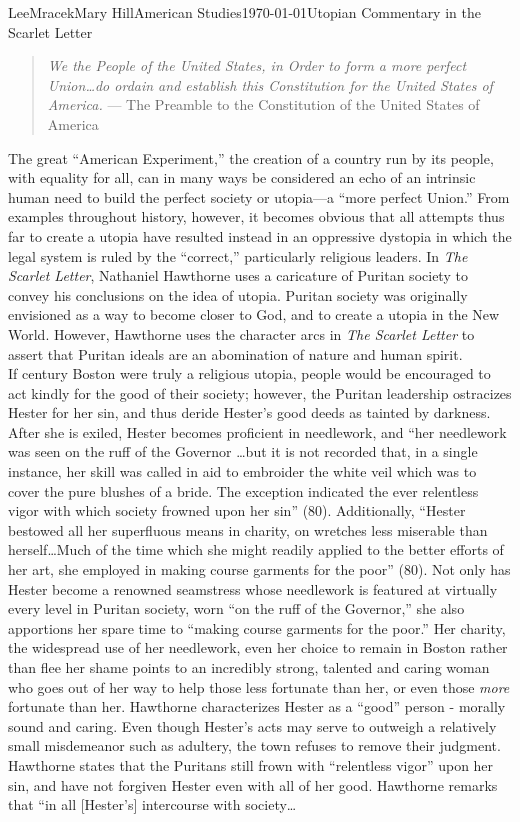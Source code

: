 \documentclass[12pt, letterpaper]{article}
\begin{document}
\begin{mla}{Lee}{Mracek}{Mary Hill}{American Studies}{\today}{Utopian Commentary in the Scarlet Letter}
\begin{quotation}
\textit{We the People of the United States, in Order to form a more perfect Union\ldots do ordain and establish this Constitution for the United States of America.} --- The Preamble to the Constitution of the United States of America
\end{quotation}
        \par The great ``American Experiment,'' the creation of a country run by its people, with equality for all, can in many ways be considered an echo of an intrinsic human need to build the perfect society or utopia---a ``more perfect Union.'' From examples throughout history, however, it becomes obvious that all attempts thus far to create a utopia have resulted instead in an oppressive dystopia in which the legal system is ruled by the ``correct,'' particularly religious leaders. In \textit{The Scarlet Letter}, Nathaniel Hawthorne uses a caricature of Puritan society to convey his conclusions on the idea of utopia. Puritan society was originally envisioned as a way to become closer to God, and to create a utopia in the New World. However, Hawthorne uses the character arcs in \textit{The Scarlet Letter} to assert that Puritan ideals are an abomination of nature and human spirit. \\
        If  century Boston were truly a religious utopia, people would be encouraged to act kindly for the good of their society; however, the Puritan leadership ostracizes Hester for her sin, and thus deride Hester's good deeds as tainted by darkness. After she is exiled, Hester becomes proficient in needlework, and ``her needlework was seen on the ruff of the Governor \ldots but it is not recorded that, in a single instance, her skill was called in aid to embroider the white veil which was to cover the pure blushes of a bride. The exception indicated the ever relentless vigor with which society frowned upon her sin'' (80). Additionally, ``Hester bestowed all her superfluous means in charity, on wretches less miserable than herself\ldots Much of the time which she might readily applied to the 
        better efforts of her art, she employed in making course garments for the poor'' (80). Not only has Hester become a renowned seamstress whose needlework is featured at virtually every level in Puritan society, worn ``on the ruff of the Governor,'' she also apportions her spare time to ``making course garments for the poor.'' Her charity, the widespread use of her needlework, even her choice to remain in Boston rather than flee her shame points to an incredibly strong, talented and caring woman who goes out of her way to help those less fortunate than her, or even those \textit{more} fortunate than her. Hawthorne characterizes Hester as a ``good'' person - morally sound and caring. Even though Hester's acts may serve to outweigh a relatively small misdemeanor such as adultery, the town refuses to remove their judgment. Hawthorne states that the Puritans still frown with ``relentless vigor'' upon her sin, and have not forgiven Hester even with all of her good. Hawthorne remarks that ``in all [Hester's] intercourse with society\ldots 

\end{mla}
\end{document}
